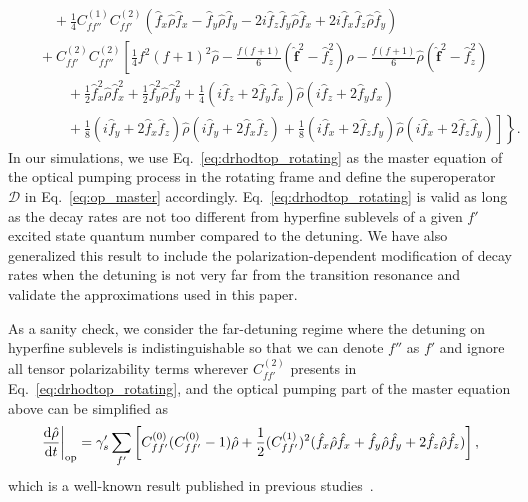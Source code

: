 \documentclass[preprint,aps,pra,onecolumn,superscriptaddress]{revtex4-1} %
\newcommand{\dt}[1]{\frac{{\mathrm d} {#1}}{{\mathrm d}t}}
\newcommand{\nn}{\nonumber}
\newcommand{\fo}{\hat{\mathbf{f}}}
\newcommand{\fx}{\hat{f}_x}
\newcommand{\fy}{\hat{f}_y}
\newcommand{\fz}{\hat{f}_z}
\newcommand{\rhoo}{\hat{\rho}}
\begin{document}
\begin{appendix}
\begin{align}
&\quad\quad +\frac{1}{4}C_{ff''}^{(1)}C_{ff'}^{(2)}(\fx\rhoo\fx-\fy\rhoo\fy-2i\fz\fy\rhoo\fx+2i\fx\fz\rhoo\fy ) \nn\\
&\quad +C_{ff'}^{(2)}C_{ff''}^{(2)}\left[\frac{1}{4}f^2(f+1)^2\rhoo-\frac{f(f+1)}{6}(\fo^2-\fz^2)\rhoo-\frac{f(f+1)}{6}\rhoo(\fo^2-\fz^2) \right.\nn\\
&\quad\quad\quad+\frac{1}{2}\fx^2\rhoo\fx^2+\frac{1}{2}\fy^2\rhoo\fy^2+\frac{1}{4}(i\fz+2\fy\fx)\rhoo(i\fz+2\fy\fx)\nn\\
&\left.\left.\quad\quad\quad +\frac{1}{8}(i\fy+2\fx\fz)\rhoo(i\fy+2\fx\fz)+\frac{1}{8}(i\fx+2\fz\fy)\rhoo(i\fx+2\fz\fy) \right]\right\}.\label{eq:drhodtop_rotating}
\end{align}
In our simulations, we use Eq.~\eqref{eq:drhodtop_rotating} as the master equation of the optical pumping process in the rotating frame and define the superoperator $ \mathcal{D} $ in Eq.~\eqref{eq:op_master} accordingly. Eq.~\eqref{eq:drhodtop_rotating} is valid as long as the decay rates are not too different from hyperfine sublevels of a given $ f' $ excited state quantum number compared to the detuning. We have also generalized this result to include the polarization-dependent modification of decay rates when the detuning is not very far from the transition resonance and validate the approximations used in this paper. 

As a sanity check, we consider the far-detuning regime where the detuning on hyperfine sublevels is indistinguishable so that we can denote $ f''$ as $f' $ and ignore all tensor polarizability terms wherever $ C_{ff'}^{(2)} $ presents in Eq.~\eqref{eq:drhodtop_rotating}, and the optical pumping part of the master equation above can be simplified as
\begin{align}\label{eq:op_fardetuning}
\left.\dt{\rhoo}\right|_{\rm op} = \gamma'_s \sum_{f'} \left[C_{ff'}^{(0)}(C_{ff'}^{(0)}-1)\rhoo+\frac{1}{2}(C_{ff'}^{(1)})^2(\fx\rhoo\fx+\fy\rhoo\fy+2\fz\rhoo\fz ) \right],
\end{align}
which is a well-known result published in previous studies~\cite{Deutsch2010a,Baragiola2014}.


\end{appendix}
\end{document}
